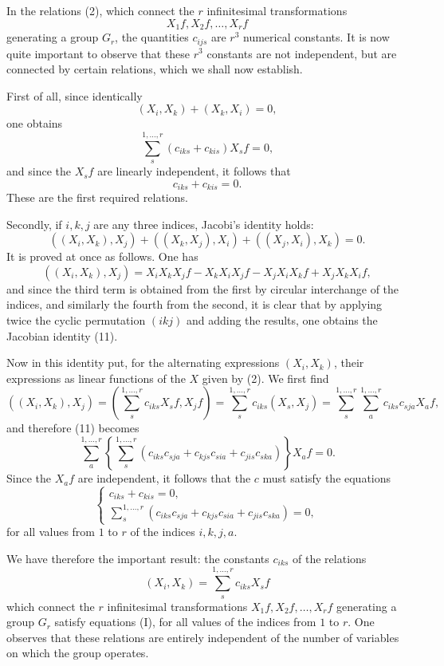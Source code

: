 \documentclass[11pt]{book}
\begin{document}
In the relations (2), which connect the $r$ infinitesimal transformations
\[
 X_1f,
 X_2f,
 \ldots,
 X_rf
\]
generating a group $G_r$, the quantities $c_{ijs}$ are $r^3$ numerical constants. It is now quite important to observe that these $r^3$ constants are not independent, but are connected by certain relations, which we shall now establish.

First of all, since identically
\[
 (X_i,X_k)+(X_k,X_i)=0,
\]
one obtains
\[
 \sum\limits_s^{1,\ldots,r}(c_{iks}+c_{kis})X_s f=0,
\]
and since the $X_sf$ are linearly independent, it follows that
\[
 c_{iks}+c_{kis}=0.
\]
These are the first required relations.

Secondly, if $i,k,j$ are any three indices, Jacobi's identity holds:
\begin{equation*}\tag{11}
 ((X_i,X_k),X_j)+((X_k,X_j),X_i)+((X_j,X_i),X_k)=0.
\end{equation*}
It is proved at once as follows. One has
\[
 ((X_i,X_k),X_j)=X_iX_kX_jf-X_kX_iX_jf-X_jX_iX_kf+X_jX_kX_if,
\]
and since the third term is obtained from the first by circular interchange of the indices, and similarly the fourth from the second, it is clear that by applying twice the cyclic permutation $(ikj)$ and adding the results, one obtains the Jacobian identity (11).

Now in this identity put, for the alternating expressions $(X_i,X_k)$, their expressions as linear functions of the $X$ given by (2). We first find
\[
 ((X_i,X_k),X_j)=
 \left(\sum\limits_s^{1,\ldots,r}c_{iks}X_sf, X_jf\right)
 =\sum\limits_s^{1,\ldots,r}c_{iks}(X_s,X_j)
 =\sum\limits_s^{1,\ldots,r}\sum\limits_a^{1,\ldots,r}c_{iks}c_{sja}X_af,
\]
and therefore (11) becomes
\[
 \sum\limits_a^{1,\ldots,r}\left\{\sum\limits_s^{1,\ldots,r}(c_{iks}c_{sja}+c_{kjs}c_{sia}+c_{jis}c_{ska})\right\}X_af=0.
\]
Since the $X_af$ are independent, it follows that the $c$ must satisfy the equations
\begin{equation*}\tag{I}
\begin{cases}
 c_{iks}+c_{kis}=0,\\[2mm]
 \displaystyle\sum\limits_s^{1,\ldots,r}
  \left(c_{iks}c_{sja}+c_{kjs}c_{sia}+c_{jis}c_{ska}\right)=0,
\end{cases}
\end{equation*}
for all values from $1$ to $r$ of the indices $i,k,j,a$.

We have therefore the important result: the constants $c_{iks}$ of the relations
\[
 (X_i,X_k)=\sum\limits_s^{1,\ldots,r}c_{iks}X_sf
\]
which connect the $r$ infinitesimal transformations $X_1f,X_2f,\ldots,X_rf$ generating a group $G_r$ satisfy equations (I), for all values of the indices from $1$ to $r$. One observes that these relations are entirely independent of the number of variables on which the group operates.
\end{document}
